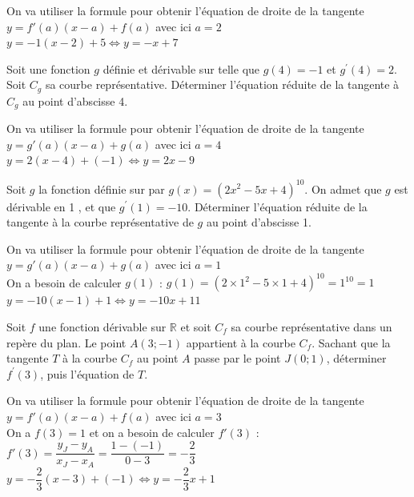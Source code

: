 \documentclass[11pt,a4paper]{article}  %
\begin{document}
\begin{corrBox}
	On va utiliser la formule pour obtenir l'équation de droite de la tangente$y=f'(a)(x-a)+f(a)$ avec ici $a=2$\\
	$y=-1(x-2)+5 \iff y=-x+7$
\end{corrBox}

\exercice{}

Soit une fonction $g$ définie et dérivable sur \R telle que $g(4)=-1$ et $g^{\prime}(4)=2$. Soit $C_g$ sa courbe représentative. Déterminer l'équation réduite de la tangente à $C_g$ au point d'abscisse 4.

\begin{corrBox}
	On va utiliser la formule pour obtenir l'équation de droite de la tangente$y=g'(a)(x-a)+g(a)$ avec ici $a=4$\\
	$y=2(x-4)+(-1) \iff y=2x-9$
\end{corrBox}

\exercice{}

Soit $g$ la fonction définie sur \R par $g(x)=\left(2 x^2-5 x+4\right)^{10}$. On admet que $g$ est dérivable en 1 , et que $g^{\prime}(1)=-10$. Déterminer l'équation réduite de la tangente à la courbe représentative de $g$ au point d'abscisse 1.

\begin{corrBox}
	On va utiliser la formule pour obtenir l'équation de droite de la tangente $y=g'(a)(x-a)+g(a)$ avec ici $a=1$\\
	On a besoin de calculer $g(1)$ : $g(1)=\left(2\times1^2-5\times1+4\right)^{10}=1^{10}=1$\\
	$y=-10(x-1)+1 \iff y=-10x+11$
\end{corrBox}

\exercice{}

Soit $f$ une fonction dérivable sur $\mathbb{R}$ et soit $C_f$ sa courbe représentative dans un repère du plan. Le point $A(3 ;-1)$ appartient à la courbe $C_f$.
Sachant que la tangente $T$ à la courbe $C_f$ au point $A$ passe par le point $J(0 ; 1)$, déterminer $f^{\prime}(3)$, puis l'équation de $T$.

\begin{corrBox}
	On va utiliser la formule pour obtenir l'équation de droite de la tangente $y=f'(a)(x-a)+f(a)$ avec ici $a=3$\\
	On a $f(3)=1$ et on a besoin de calculer $f'(3)$ : $f'(3)=\dfrac{y_J-y_A}{x_J-x_A}=\dfrac{1-(-1)}{0-3}=-\dfrac{2}{3}$\\
	$y=-\dfrac{2}{3}(x-3)+(-1) \iff y=-\dfrac{2}{3}x+1$
\end{corrBox}
\end{document}
